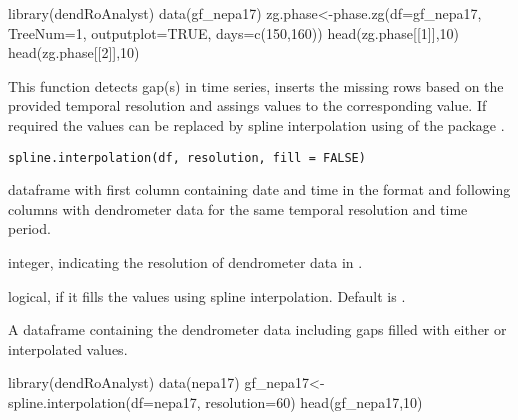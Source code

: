 \documentclass[a4paper]{book}
\begin{document}
%
\begin{Examples}
\begin{ExampleCode}
library(dendRoAnalyst)
data(gf_nepa17)
zg.phase<-phase.zg(df=gf_nepa17, TreeNum=1, outputplot=TRUE, days=c(150,160))
head(zg.phase[[1]],10)
head(zg.phase[[2]],10)

\end{ExampleCode}
\end{Examples}
%
\begin{Description}\relax
This function detects gap(s) in time series, inserts the missing rows based on the provided temporal resolution and assings  values to the corresponding value. If required the  values can be replaced by spline interpolation using  of the package .
\end{Description}
%
\begin{Usage}
\begin{verbatim}
spline.interpolation(df, resolution, fill = FALSE)
\end{verbatim}
\end{Usage}
%
\begin{Arguments}
\begin{ldescription}
\item[\code{df}] dataframe with first column containing date and time in the format  and following columns with dendrometer data for the same temporal resolution and time period.

\item[\code{resolution}] integer, indicating the resolution of dendrometer data in .

\item[\code{fill}] logical, if  it fills the  values using spline interpolation. Default is .
\end{ldescription}
\end{Arguments}
%
\begin{Value}
A dataframe containing the dendrometer data including gaps filled with either  or interpolated values.
\end{Value}
%
\begin{Examples}
\begin{ExampleCode}
library(dendRoAnalyst)
data(nepa17)
gf_nepa17<-spline.interpolation(df=nepa17, resolution=60)
head(gf_nepa17,10)

\end{ExampleCode}
\end{Examples}
\end{document}
